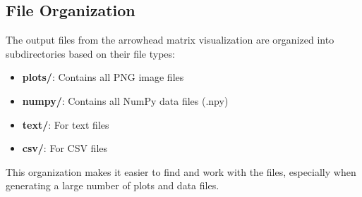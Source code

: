 \subsection{File Organization}

The output files from the arrowhead matrix visualization are organized into subdirectories based on their file types:

\begin{itemize}
    \item \textbf{plots/}: Contains all PNG image files
    \item \textbf{numpy/}: Contains all NumPy data files (.npy)
    \item \textbf{text/}: For text files
    \item \textbf{csv/}: For CSV files
\end{itemize}

This organization makes it easier to find and work with the files, especially when generating a large number of plots and data files.
